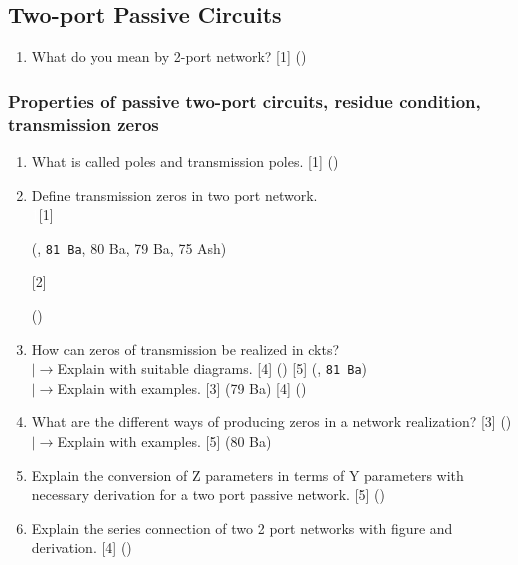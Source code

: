 \documentclass[12pt]{article}
\newcommand{\lb}{\\$\left|\rightarrow\right.$}
\newcommand{\enter}{\\\textcolor{white}{1}}
\begin{document}
\subsection{Two-port Passive Circuits}
\begin{enumerate}[noitemsep, topsep=0pt]
	\item What do you mean by 2-port network? \hfill [1] () 
\end{enumerate}
\subsubsection{Properties of passive two-port circuits, residue condition, transmission zeros}
\begin{enumerate}
	\item What is called poles and transmission poles. \hfill [1] ()

	\item Define transmission zeros in two port network.
	\enter\hfill [1] \begin{footnotesize}(, \texttt{81 Ba}, 80 Ba, 79 Ba, 75 Ash)\end{footnotesize} [2] \begin{footnotesize}()\end{footnotesize}
	
	\item How can zeros of transmission be realized in ckts?
	\lb Explain with suitable diagrams. \hfill [4] () [5] (, \texttt{81 Ba})
	\lb Explain with examples. \hfill [3] (79 Ba) [4] ()
	
	\item What are the different ways of producing zeros in a network realization? \hfill [3] ()
	\lb Explain with examples. \hfill [5] (80 Ba)

	\item Explain the conversion of Z parameters in terms of Y parameters with necessary derivation for a two port passive network. \hfill [5] ()	
	
	\item Explain the series connection of two 2 port networks with figure and derivation. \hfill [4] ()
\end{enumerate}
\end{document}

